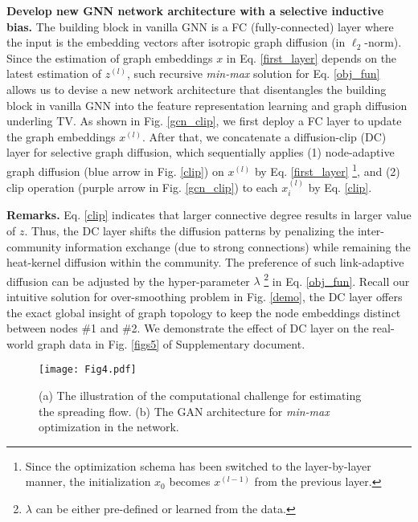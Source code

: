 \documentclass{article}
\begin{document}
\textbf{Develop new GNN network architecture with a selective inductive bias.} The building block in vanilla GNN \cite{kipf2016semi} is a FC (fully-connected) layer where the input is the embedding vectors after isotropic graph diffusion (in ${\ell _2}$-norm). Since the estimation of graph embeddings $x$ in Eq. \ref{first_layer} depends on the latest estimation of $z^{(l)}$, such recursive \textit{min-max} solution for Eq. \ref{obj_fun} allows us to devise a new network architecture that disentangles the building block in vanilla GNN into the feature representation learning and graph diffusion underling TV. As shown in Fig. \ref{gcn_clip}, we first deploy a FC layer to update the graph embeddings $x^{(l)}$. After that, we concatenate a diffusion-clip (DC) layer for selective graph diffusion, which sequentially applies (1) node-adaptive graph diffusion (blue arrow in Fig. \ref{clip}) on $x^{(l)}$ by Eq. \ref{first_layer} \footnote{Since the optimization schema has been switched to the layer-by-layer manner, the initialization $x_0$ becomes $x^{(l-1)}$ from the previous layer.}, and (2) clip operation (purple arrow in Fig. \ref{gcn_clip}) to each $x^{(l)}_i$ by Eq. \ref{clip}.

\textbf{Remarks.} Eq. \ref{clip} indicates that larger connective degree results in larger value of $z$. Thus, the DC layer shifts the diffusion patterns by penalizing the inter-community information exchange (due to strong connections) while remaining the heat-kernel diffusion within the community. The preference of such link-adaptive diffusion can be adjusted by the hyper-parameter $\lambda$ \footnote{$\lambda$ can be either pre-defined or learned from the data.} in Eq. \ref{obj_fun}. Recall our intuitive solution for over-smoothing problem in Fig. \ref{demo}, the DC layer offers the exact global insight of graph topology to keep the node embeddings distinct between nodes \#1 and \#2. We demonstrate the effect of DC layer on the real-world graph data in Fig. \ref{figs5} of Supplementary document.

\begin{figure}
  \centering
  \texttt{[image: Fig4.pdf]}
  \vspace{-1.5em}
  \caption{\small (a) The illustration of the computational challenge for estimating the spreading flow. (b) The GAN architecture for \textit{min-max} optimization in the network.}
  \label{fig_flownet}
  \vspace{-1.5em}
\end{figure}
\end{document}
